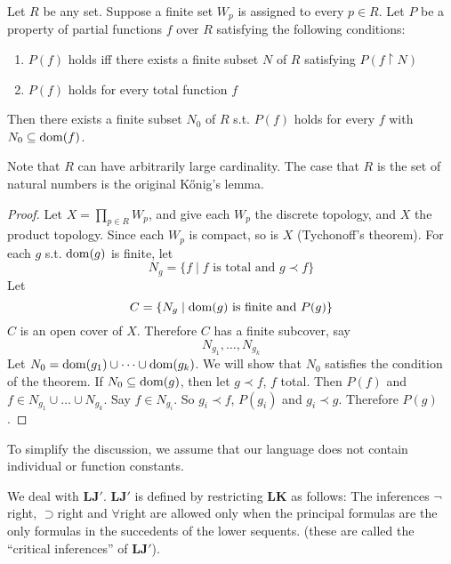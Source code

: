 \documentclass[11pt]{article}
\def \LJ {\textbf{LJ}}
\def \LK {\textbf{LK}}
\begin{document}
\begin{proposition}
Let \(R\) be any set. Suppose a finite set \(W_p\) is assigned to every \(p\in R\). Let \(P\) be
a property of partial functions \(f\) over \(R\) satisfying the following conditions:
\begin{enumerate}
\item \(P(f)\) holds iff there exists a finite subset \(N\) of \(R\) satisfying \(P(f\restriction N)\)
\item \(P(f)\) holds for every total function \(f\)
\end{enumerate}


Then there exists a finite subset \(N_0\)  of \(R\) s.t. \(P(f)\) holds for every \(f\) with \(N_0\subseteq\operatorname{dom}(f)\).
\end{proposition}

Note that \(R\) can have arbitrarily large cardinality. The case that \(R\) is the set of natural
numbers is the original Kőnig's lemma.

\begin{proof}
Let \(X=\prod_{p\in R}W_p\), and give each \(W_p\) the discrete topology, and \(X\) the product
topology. Since each \(W_p\) is compact, so is \(X\) (Tychonoff's theorem). For each \(g\)
s.t. \(\operatorname{dom}(g)\) is  finite, let
\begin{equation*}
N_g=\{f\mid f\text{ is total and }g\prec f\}
\end{equation*}
Let
\begin{equation*}
C=\{N_g\mid\operatorname{dom}(g)\text{ is finite and }P(g)\}
\end{equation*}
\(C\) is an open cover of \(X\). Therefore \(C\) has a finite subcover, say
\begin{equation*}
N_{g_1},\dots,N_{g_k}
\end{equation*}
Let \(N_0=\operatorname{dom}(g_1)\cup\dots\cup\operatorname{dom}(g_k)\). We will show that \(N_0\) satisfies the condition
of the theorem. If \(N_0\subseteq\operatorname{dom}(g)\), then let \(g\prec f\), \(f\) total. Then \(P(f)\)
and \(f\in N_{g_1}\cup\dots\cup N_{g_k}\). Say \(f\in N_{g_i}\). So \(g_i\prec f\), \(P(g_i)\)
and \(g_i\prec g\). Therefore \(P(g)\).
\end{proof}

To simplify the discussion, we assume that our language does not contain individual or function
constants.

We deal with \(\LJ'\). \(\LJ'\) is defined by restricting \(\LK\) as follows: The
inferences \(\neg\)right, \(\supset\)right and \(\forall\)right are allowed only when the
principal formulas are the only formulas in the succedents of the lower sequents. (these are
called the ``critical inferences'' of \(\LJ'\)).
\end{document}

